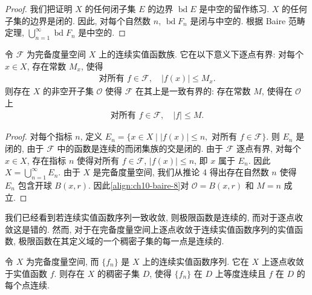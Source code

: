 \documentclass[../../main.tex]{subfiles}
\begin{document}
\begin{proof}
我们把证明 $X$ 的任何闭子集 $E$ 的边界 $\operatorname{bd}E$ 是中空的留作练习. $X$ 的任何子集的边界是闭的. 因此, 对每个自然数 $n$, $\operatorname{bd}F_{n}$ 是闭与中空的. 根据 Baire 范畴定理, $\bigcup_{n=1}^{\infty}\operatorname{bd}F_{n}$ 是中空的.
\end{proof}

\begin{theorem}\label{theorem:ch10-baire定理6}
令 $\mathcal{F}$ 为完备度量空间 $X$ 上的连续实值函数族. 它在以下意义下逐点有界: 对每个 $x\in X$, 存在常数 $M_{x}$, 使得
\begin{align*}
\text{对所有 }f\in\mathcal{F},\quad|f(x)|\leqslant M_{x}.
\end{align*}
则存在 $X$ 的非空开子集 $\mathcal{O}$ 使得 $\mathcal{F}$ 在其上是一致有界的: 存在常数 $M$, 使得在 $\mathcal{O}$ 上
\begin{align}
\text{对所有 }f\in\mathcal{F},\quad|f|\leqslant M.\label{align:ch10-baire-8}
\end{align}
\end{theorem}

\begin{proof}
对每个指标 $n$, 定义 $E_{n}=\{x\in X\mid|f(x)|\leqslant n,\text{ 对所有 }f\in\mathcal{F}\}$. 则 $E_{n}$ 是闭的, 由于 $\mathcal{F}$ 中的函数是连续的而闭集族的交是闭的. 由于 $\mathcal{F}$ 逐点有界, 对每个 $x\in X$, 存在指标 $n$ 使得对所有 $f\in\mathcal{F}$, $|f(x)|\leqslant n$, 即 $x$ 属于 $E_{n}$. 因此 $X=\bigcup_{n=1}^{\infty}E_{n}$. 由于 $X$ 是完备度量空间, 我们从推论 4 得出存在自然数 $n$ 使得 $E_{n}$ 包含开球 $B(x,r)$. 因此\eqref{align:ch10-baire-8}对 $\mathcal{O}=B(x,r)$ 和 $M=n$ 成立.
\end{proof}

我们已经看到若连续实值函数序列一致收敛, 则极限函数是连续的, 而对于逐点收敛这是错的. 然而, 对于在完备度量空间上逐点收敛于连续实值函数序列的实值函数, 极限函数在其定义域的一个稠密子集的每一点是连续的.

\begin{theorem}\label{theorem:ch10-baire定理7}
令 $X$ 为完备度量空间, 而 $\{f_{n}\}$ 是 $X$ 上的连续实值函数序列. 它在 $X$ 上逐点收敛于实值函数 $f$. 则存在 $X$ 的稠密子集 $D$, 使得 $\{f_{n}\}$ 在 $D$ 上等度连续且 $f$ 在 $D$ 的每个点连续.
\end{theorem}
\end{document}
